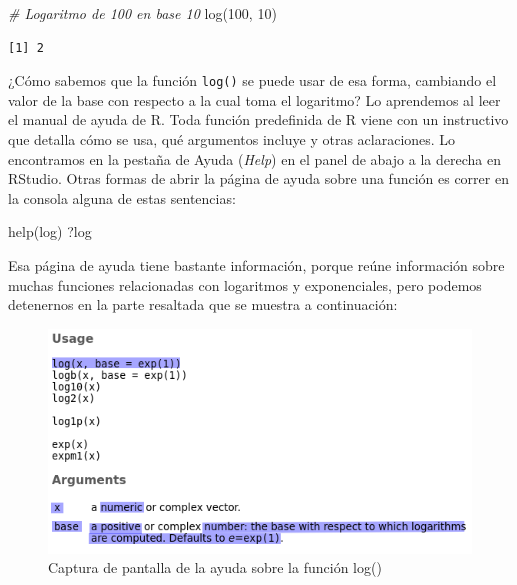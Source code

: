 \documentclass[
]{book}
\newenvironment{Shaded}{\begin{snugshade}}{\end{snugshade}}
\newcommand{\CommentTok}[1]{\textcolor[rgb]{0.56,0.35,0.01}{\textit{#1}}}
\newcommand{\DecValTok}[1]{\textcolor[rgb]{0.00,0.00,0.81}{#1}}
\newcommand{\FunctionTok}[1]{\textcolor[rgb]{0.00,0.00,0.00}{#1}}
\newcommand{\NormalTok}[1]{#1}
\begin{document}
\begin{Shaded}
\begin{Highlighting}[]
\CommentTok{\# Logaritmo de 100 en base 10}
\FunctionTok{log}\NormalTok{(}\DecValTok{100}\NormalTok{, }\DecValTok{10}\NormalTok{)}
\end{Highlighting}
\end{Shaded}

\begin{verbatim}
[1] 2
\end{verbatim}

¿Cómo sabemos que la función \texttt{log()} se puede usar de esa forma, cambiando el valor de la base con respecto a la cual toma el logaritmo? Lo aprendemos al leer el manual de ayuda de R. Toda función predefinida de R viene con un instructivo que detalla cómo se usa, qué argumentos incluye y otras aclaraciones. Lo encontramos en la pestaña de Ayuda (\emph{Help}) en el panel de abajo a la derecha en RStudio. Otras formas de abrir la página de ayuda sobre una función es correr en la consola alguna de estas sentencias:

\begin{Shaded}
\begin{Highlighting}[]
\FunctionTok{help}\NormalTok{(log)}
\NormalTok{?log}
\end{Highlighting}
\end{Shaded}

Esa página de ayuda tiene bastante información, porque reúne información sobre muchas funciones relacionadas con logaritmos y exponenciales, pero podemos detenernos en la parte resaltada que se muestra a continuación:

\begin{figure}

{\centering \includegraphics[width=0.7\linewidth]{images/03_funciones/ayuda} 

}

\caption{Captura de pantalla de la ayuda sobre la función log()}\label{fig:unnamed-chunk-72}
\end{figure}
\end{document}
